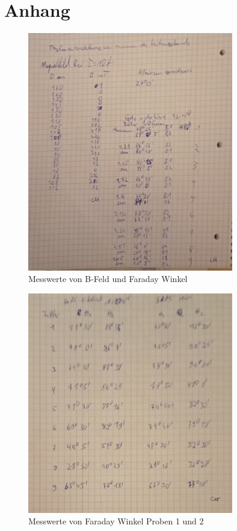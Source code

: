 \newpage
\printbibliography

\section*{Anhang}
\begin{figure}[H]
	\centering
	\includegraphics[width=0.8\textwidth]{Bilder/Daten_V46.pdf}
	\caption{Messwerte von B-Feld und Faraday Winkel}
	\label{fig:Messwert1}
\end{figure}
\begin{figure}[H]
	\centering
	\includegraphics[width=0.8\textwidth]{Bilder/Daten_V46.png}
	\caption{Messwerte von Faraday Winkel Proben 1 und 2}
	\label{fig:Messwert2}
\end{figure}
